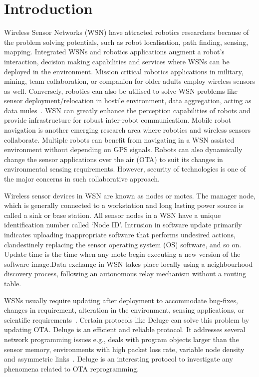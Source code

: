\documentclass[conference,manuscript]{IEEEtran}
\begin{document}
\section{Introduction}
\label{sec:intro}

Wireless Sensor Networks (WSN) have attracted robotics
researchers because of the problem solving potentials, such as
robot localisation, path finding, sensing, mapping. Integrated
WSNs and robotics applications augment a robot's interaction,
decision making capabilities and services where WSNs can be
deployed in the environment. Mission critical robotics applications in military, mining, team collaboration, or companion
for older adults employ wireless sensors as well. Conversely,
robotics can also be utilised to solve WSN problems like
sensor deployment/relocation in hostile environment, data aggregation, acting as data mules~\cite{Shue13}.
WSN can greatly enhance
the perception capabilities of robots and provide infrastructure
for robust inter-robot communication. Mobile robot navigation is another emerging research area where robotics and
wireless sensors collaborate. Multiple robots can benefit from
navigating in a WSN assisted environment without depending
on GPS signals. Robots can also dynamically change the
sensor applications over the air (OTA) to suit its changes
in environmental sensing requirements. However, security of
technologies is one of the major concerns in such collaborative
approach.

Wireless sensor devices in WSN are known as nodes or
motes. The manager node, which is generally connected to
a workstation and long lasting power source is called a sink
or base station. All sensor nodes in a WSN have a unique
identification number called ‘Node ID’. Intrusion in software
update primarily indicates uploading inappropriate software
that performs undesired actions, clandestinely replacing the
sensor operating system (OS) software, and so on. Update time
is the time when any mote begin executing a new version
of the software image.Data exchange in WSN takes place
locally using a neighbourhood discovery process, following
an autonomous relay mechanism without a routing table.

WSNs usually require updating after deployment to accommodate bug-fixes, changes in requirement, alteration in
the environment, sensing applications, or scientific requirements~\cite{ISI:000253439700120}.
Certain protocols like Deluge can solve this problem
by updating OTA. Deluge is an efficient and reliable protocol.
It addresses several network programming issues e.g., deals
with program objects larger than the sensor memory, environments with high packet loss rate, variable node density
and asymmetric links~\cite{1031506}.
Deluge is an interesting protocol
to investigate any phenomena related to OTA reprogramming.
\end{document}
